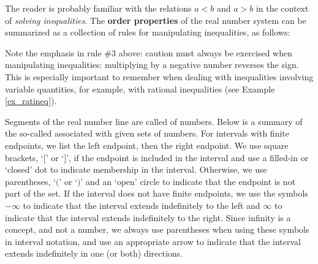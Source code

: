 \medskip

The reader is probably familiar with the relations $a<b$ and $a>b$ in the context of \textit{solving inequalities}. The \textbf{order properties} of the real number system can be summarized as a collection of rules for manipulating inequalities, as follows:\\


Note the emphasis in rule \#3 above: caution must always be exercised when manipulating inequalities: multiplying by a negative number reverses the sign. This is especially important to remember when dealing with inequalities involving variable quantities, for example, with rational inequalities (see Example \ref{ex_ratineq}).

\medskip

 Segments of the real number line are called  of numbers. Below is a summary of the so-called  associated with given sets of numbers.  For intervals with finite endpoints, we list the left endpoint, then the right endpoint.  We use square brackets, `$[$' or `$]$', if the endpoint is included in the interval and use a filled-in or `closed' dot to indicate membership in the interval. Otherwise, we use parentheses, `$($' or `$)$' and an `open' circle to indicate that the endpoint is not part of the set.  If the interval does not have finite endpoints, we use the symbols $-\infty$ to indicate that the interval extends indefinitely to the left and $\infty$ to indicate that the interval extends indefinitely to the right.  Since infinity is a concept, and not a number, we always use parentheses when using these symbols in interval notation, and use an appropriate arrow to indicate that the interval extends indefinitely in one (or both) directions.

